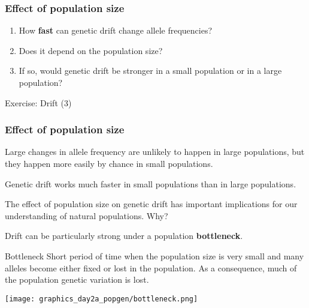 \documentclass{beamer}
\newcommand{\1}{\ensuremath{\mathbf{1}}}
\begin{document}
%
%
%
\begin{frame}\frametitle{Effect of population size}
	\begin{enumerate}
		\item How \textbf{fast} can genetic drift change allele frequencies?
		\item Does it depend on the population size?
		\item If so, would genetic drift be stronger in a small population or in a large population?
	\end{enumerate}
\end{frame}
%
%
%
\begin{frame}
	\begin{center}
		Exercise: Drift (3)
	\end{center}
\end{frame}
%
%
%
\begin{frame}\frametitle{Effect of population size}
	Large changes in allele frequency are unlikely to happen in large populations, but they happen more easily by chance in small populations.\\[2ex]
	\begin{block}{}
		Genetic drift works much faster in small populations than in large populations.
	\end{block}
	\vspace{2ex}The effect of population size on genetic drift has important implications for our understanding of natural populations. Why?
\end{frame}
%
%
%
\begin{frame}
	Drift can be particularly strong under a population \textbf{bottleneck}.
	\begin{block}{Bottleneck}
		Short period of time when the population size is very small and many alleles become either fixed or lost in the population. As a consequence, much of the population genetic variation is lost.
	\end{block}
	\begin{center}
		\texttt{[image: graphics\_day2a\_popgen/bottleneck.png]}
	\end{center}
\end{frame}
\end{document}
